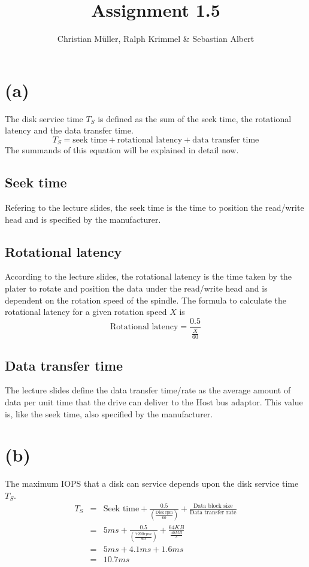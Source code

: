 \documentclass{article}
\title{Assignment 1.5}
\author{Christian M\"uller, Ralph Krimmel \& Sebastian Albert }
\begin{document}
\maketitle
\section*{(a)}
The disk service time $T_S$  is defined as the sum of the seek time, the rotational latency and the data transfer time. \\
\begin{equation}
T_S = \text{seek time} + \text{rotational latency} + \text{data transfer time}
\end{equation}
The summands of this equation will be explained in detail now.
\subsection*{Seek time}
Refering to the lecture slides, the seek time is the time to position the read/write head and is specified by the manufacturer.
\subsection*{Rotational latency}
According to the lecture slides, the rotational latency is the time taken by the plater to rotate and position the data under the read/write head and is dependent on the rotation speed of the spindle. The formula to calculate the rotational latency for a given rotation speed $X$ is \\
\begin{equation}
\text{Rotational latency} = \frac{0.5}{\frac{X}{60}}
\end{equation}
\subsection*{Data transfer time}
The lecture slides define the data transfer time/rate as the average amount of data per unit time that the drive can deliver to the Host bus adaptor. This value is, like the seek time,  also specified by the manufacturer.

\section*{(b)}
The maximum IOPS that a disk can service depends upon the disk service time $T_S$. 
\begin{eqnarray*}
T_S &=& \text{Seek time} + \frac{0.5}{(\frac{\text{Disk rpm}}{60})} + \frac{\text{Data block size}}{\text{Data transfer rate}} \\
    &=& 5ms + \frac{0.5}{(\frac{7200rpm}{60})} + \frac{64KB}{\frac{40MB}{s}}\\
    &=& 5ms + 4.1ms + 1.6ms \\
    &=& 10.7ms
\end{eqnarray*}
\end{document}
